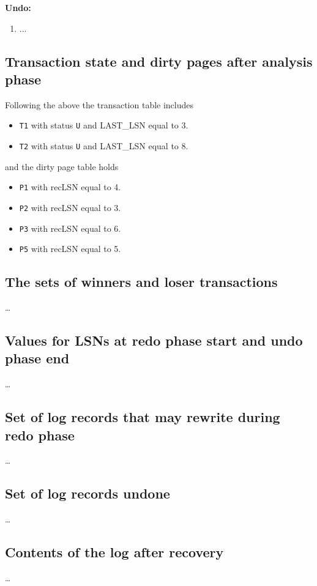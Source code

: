 \noindent
{\bf Undo:}

\begin{enumerate}
\item ...
\end{enumerate}

\subsection{Transaction state and dirty pages after analysis phase}
Following the above the transaction table includes
\begin{itemize}
\item {\tt T1} with status {\tt U} and LAST\_LSN equal to 3.
\item {\tt T2} with status {\tt U} and LAST\_LSN equal to 8.
\end{itemize}
and the dirty page table holds
\begin{itemize}
\item {\tt P1} with recLSN equal to 4.
\item {\tt P2} with recLSN equal to 3.
\item {\tt P3} with recLSN equal to 6.
\item {\tt P5} with recLSN equal to 5.
\end{itemize}

\subsection{The sets of winners and loser transactions}
\dots

\subsection{Values for LSNs at redo phase start and undo phase end}
\dots

\subsection{Set of log records that may rewrite during redo phase}
\dots

\subsection{Set of log records undone}
\dots

\subsection{Contents of the log after recovery}
\dots

